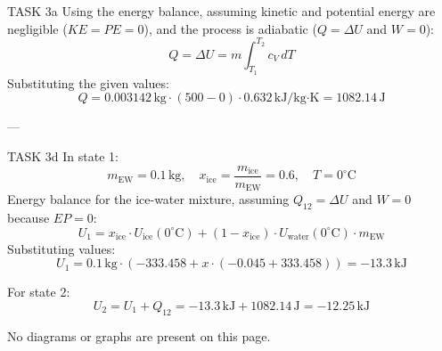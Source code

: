 TASK 3a  
Using the energy balance, assuming kinetic and potential energy are negligible (\( KE = PE = 0 \)), and the process is adiabatic (\( Q = \Delta U \) and \( W = 0 \)):  
\[
Q = \Delta U = m \int_{T_1}^{T_2} c_V \, dT
\]  
Substituting the given values:  
\[
Q = 0.003142 \, \text{kg} \cdot (500 - 0) \cdot 0.632 \, \text{kJ/kg·K} = 1082.14 \, \text{J}
\]  

---

TASK 3d  
In state 1:  
\[
m_{\text{EW}} = 0.1 \, \text{kg}, \quad x_{\text{ice}} = \frac{m_{\text{ice}}}{m_{\text{EW}}} = 0.6, \quad T = 0^\circ\text{C}
\]  
Energy balance for the ice-water mixture, assuming \( Q_{12} = \Delta U \) and \( W = 0 \) because \( EP = 0 \):  
\[
U_1 = x_{\text{ice}} \cdot U_{\text{ice}}(0^\circ\text{C}) + (1 - x_{\text{ice}}) \cdot U_{\text{water}}(0^\circ\text{C}) \cdot m_{\text{EW}}
\]  
Substituting values:  
\[
U_1 = 0.1 \, \text{kg} \cdot (-333.458 + x \cdot (-0.045 + 333.458)) = -13.3 \, \text{kJ}
\]  

For state 2:  
\[
U_2 = U_1 + Q_{12} = -13.3 \, \text{kJ} + 1082.14 \, \text{J} = -12.25 \, \text{kJ}
\]  

No diagrams or graphs are present on this page.